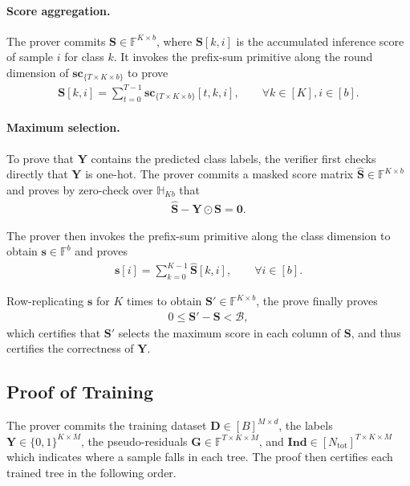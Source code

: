 \paragraph{Score aggregation.}
The prover commits
$\mathbf{S}\in\mathbb{F}^{K\times b}$, where
$\mathbf{S}[k,i]$ is the accumulated inference score of sample
$i$ for class $k$.
It invokes the prefix-sum primitive along the round dimension of
$\mathbf{sc}_{\{T\times K\times b\}}$ to prove
\begin{align}
    \mathbf{S}[k,i]
    =
    \sum_{t=0}^{T-1}
    \mathbf{sc}_{\{T\times K\times b\}}[t,k,i],
    \qquad
    \forall k\in[K], i\in[b].
\end{align}

\paragraph{Maximum selection.}
To prove that $\mathbf{Y}$ contains the predicted class labels, the verifier
first checks directly that $\mathbf{Y}$ is one-hot.
The prover commits a masked score matrix
$\widehat{\mathbf{S}}\in\mathbb{F}^{K\times b}$ and proves by zero-check
over $\mathbb{H}_{Kb}$ that
\begin{align}
    \widehat{\mathbf{S}}
    -
    \mathbf{Y}\odot\mathbf{S}
    =
    \mathbf{0}.
\end{align}

The prover then invokes the prefix-sum primitive along the class dimension to
obtain $\mathbf{s}\in\mathbb{F}^{b}$ and proves
\begin{align}
    \mathbf{s}[i]
    =
    \sum_{k=0}^{K-1}\widehat{\mathbf{S}}[k,i],
    \qquad
    \forall i\in[b].
\end{align}

Row-replicating $\mathbf{s}$ for $K$ times 
    to obtain $\mathbf{S}'\in \mathbb{F}^{K\times b}$, the prove finally proves
    \begin{align}
        0\leq \mathbf{S}' - \mathbf{S} < \mathcal{B},
    \end{align}
    which certifies that $\mathbf{S}'$ selects the maximum score in each column of $\mathbf{S}$, and thus certifies the correctness of $\mathbf{Y}$.

\subsection{Proof of Training}\label{subsec:zkgbdt-training}

The prover commits the training dataset
$\mathbf{D}\in[B]^{M\times d}$, the labels
$\mathbf{Y}\in\{0,1\}^{K\times M}$, the pseudo-residuals
$\mathbf{G}\in\mathbb{F}^{T\times K\times M}$, and
$\mathbf{Ind}\in[N_{\mathrm{tot}}]^{T\times K\times M}$
which indicates where a sample falls in each tree.
The proof then certifies each trained tree in the following order.

